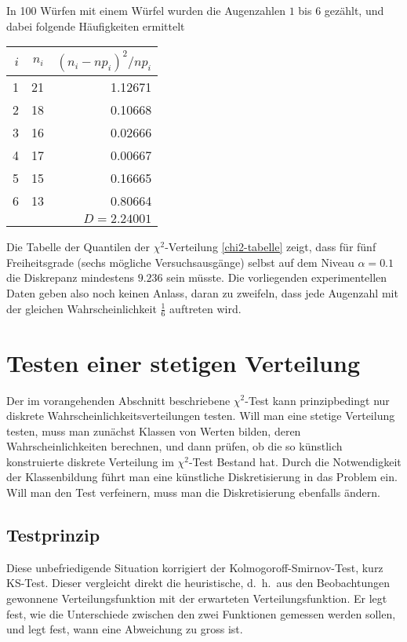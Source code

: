In 100 Würfen mit einem Würfel wurden die Augenzahlen $1$ bis $6$ gezählt,
und dabei folgende Häufigkeiten ermittelt
\begin{center}
\begin{tabular}{|r|r|r|}
\hline
$i$&$n_i$&$(n_i-np_i)^2/np_i$\\
\hline
1&21&1.12671\\
2&18&0.10668\\
3&16&0.02666\\
4&17&0.00667\\
5&15&0.16665\\
6&13&0.80664\\
\hline
&&$D=2.24001$\\
\hline
\end{tabular}
\end{center}
Die Tabelle der Quantilen der $\chi^2$-Verteilung \ref{chi2-tabelle}
zeigt, dass für fünf Freiheitsgrade (sechs mögliche Versuchsausgänge)
selbst auf dem Niveau $\alpha=0.1$ die Diskrepanz mindestens $9.236$ sein
müsste.
Die vorliegenden experimentellen Daten geben also noch keinen
Anlass, daran zu zweifeln, dass jede Augenzahl mit der gleichen
Wahrscheinlichkeit $\frac16$ auftreten wird.

\section{Testen einer stetigen Verteilung}
\label{section-testen-stetiger-wkeitsverteilung}
Der im vorangehenden Abschnitt beschriebene $\chi^2$-Test kann prinzipbedingt
nur diskrete Wahrscheinlichkeitsverteilungen testen.
Will man eine stetige
Verteilung testen, muss man zunächst Klassen von Werten bilden,
deren Wahrscheinlichkeiten berechnen, und dann prüfen, ob die so
künstlich konstruierte diskrete Verteilung im $\chi^2$-Test Bestand hat.
Durch die Notwendigkeit der Klassenbildung führt man eine künstliche
Diskretisierung in das Problem ein.
Will man den Test verfeinern, muss man
die Diskretisierung ebenfalls ändern.

\subsection{Testprinzip}
Diese unbefriedigende Situation korrigiert der Kolmogoroff-Smirnov-Test,
kurz KS-Test.
Dieser vergleicht direkt die heuristische, d.~h.~aus den Beobachtungen gewonnene
Verteilungsfunktion mit der erwarteten Verteilungsfunktion.
Er legt fest,
wie die Unterschiede zwischen den zwei Funktionen gemessen werden sollen,
und legt fest, wann eine Abweichung zu gross ist.


